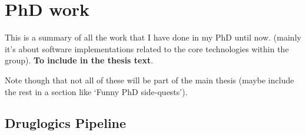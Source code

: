 \documentclass[
  12pt,
]{book}
\begin{document}
\hypertarget{phd-work}{%
\chapter{PhD work}\label{phd-work}}

This is a summary of all the work that I have done in my PhD until now.
(mainly it's about software implementations related to the core technologies
within the group). \textbf{To include in the thesis text}.

Note though that not all of these will be part of the main thesis (maybe include the
rest in a section like `Funny PhD side-quests').

\hypertarget{druglogics-pipeline}{%
\section*{Druglogics Pipeline}\label{druglogics-pipeline}}
\end{document}
